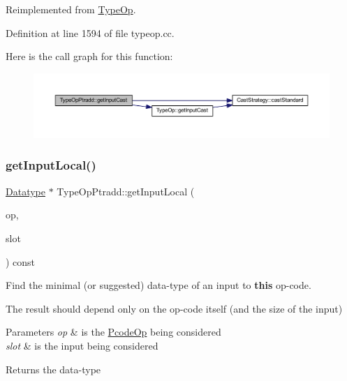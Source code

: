 Reimplemented from \mbox{\hyperlink{class_type_op_a950c417e4af100d176a701af5816b5ab}{Type\+Op}}.



Definition at line 1594 of file typeop.\+cc.

Here is the call graph for this function\+:
\nopagebreak
\begin{figure}[H]
\begin{center}
\leavevmode
\includegraphics[width=350pt]{class_type_op_ptradd_ae946ae561b73a60e3df2be75280cf501_cgraph}
\end{center}
\end{figure}
\mbox{\label{class_type_op_ptradd_a80258521d1b2a930d1472fcf1b6c53eb}} 
\subsubsection{\texorpdfstring{getInputLocal()}{getInputLocal()}}
{\footnotesize\ttfamily \mbox{\hyperlink{class_datatype}{Datatype}} $\ast$ Type\+Op\+Ptradd\+::get\+Input\+Local (\begin{DoxyParamCaption}\item[{const \mbox{\hyperlink{class_pcode_op}{Pcode\+Op}} $\ast$}]{op,  }\item[{int4}]{slot }\end{DoxyParamCaption}) const\hspace{0.3cm}{\ttfamily [virtual]}}



Find the minimal (or suggested) data-\/type of an input to {\bfseries{this}} op-\/code. 

The result should depend only on the op-\/code itself (and the size of the input) 
\begin{DoxyParams}{Parameters}
{\em op} & is the \mbox{\hyperlink{class_pcode_op}{Pcode\+Op}} being considered \\
\hline
{\em slot} & is the input being considered \\
\hline
\end{DoxyParams}
\begin{DoxyReturn}{Returns}
the data-\/type 
\end{DoxyReturn}


